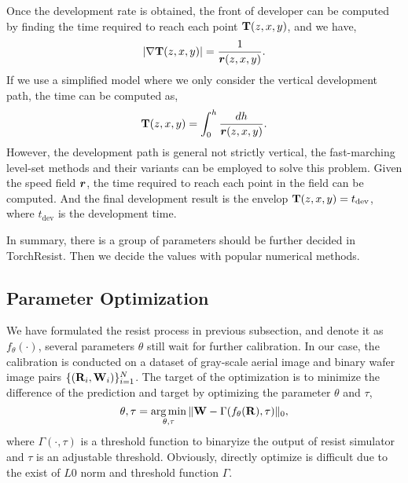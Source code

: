Once the development rate is obtained, the front of developer can be computed by finding the time required to reach each point ${\mathbf{T}}(z,x,y)$, and we have,
\begin{equation}
    \left\vert \nabla{\mathbf{T}}(z,x,y)\right\vert = \frac{1}{{\bm{r}}(z,x,y)}.
\end{equation}
If we use a simplified model where we only consider the vertical development path, the time can be computed as,
\begin{equation}
    {\mathbf{T}}(z,x,y) = \int_0^h\frac{dh}{{\bm{r}}(z,x,y)}.
\end{equation}
However, the development path is general not strictly vertical, the fast-marching level-set methods and their variants\cite{osher2001level,sethian1996fast,dai2014fast} can be employed to solve this problem. Given the speed field ${\bm{r}}$, the time required to reach each point in the field can be computed. And the final development result is the envelop ${\mathbf{T}}(z,x,y) = t_\text{dev}$, where $t_\text{dev}$ is the development time.


In summary, there is a group of parameters should be further decided in TorchResist. Then we decide the values with popular numerical methods. 

% 



\subsection{Parameter Optimization}



We have formulated the resist process in previous subsection, and denote it as $f_\theta(\cdot)$, several parameters $\theta$ still wait for further calibration. In our case, the calibration is conducted on a dataset of gray-scale aerial image and binary wafer image pairs $\{({\mathbf{R}}_i,{\mathbf{W}}_i)\}_{i=1}^N$. The target of the optimization is to minimize the difference of the prediction and target by optimizing the parameter $\theta$ and $\tau$,
\begin{equation}
      \theta, \tau = \operatorname*{arg\,min}_{\theta,\tau} \| {\mathbf{W}} - \Gamma(f_\theta({\mathbf{R}}) , \tau)\|_0, \label{eq:object}
\end{equation}
where $\Gamma(\cdot, \tau)$ is a threshold function to binaryize the output of resist simulator and $\tau$ is an adjustable threshold. Obviously, directly optimize  is difficult due to the exist of $L0$ norm and threshold function $\Gamma$. 

